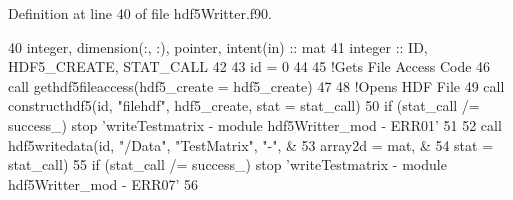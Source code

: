 Definition at line 40 of file hdf5\+Writter.\+f90.


\begin{DoxyCode}
40     \textcolor{keywordtype}{integer}, \textcolor{keywordtype}{dimension(:, :)}, \textcolor{keywordtype}{pointer}, \textcolor{keywordtype}{intent(in)} :: mat
41     \textcolor{keywordtype}{integer} :: ID, HDF5\_CREATE, STAT\_CALL
42     
43     id = 0
44     
45         \textcolor{comment}{!Gets File Access Code}
46         \textcolor{keyword}{call }gethdf5fileaccess(hdf5\_create = hdf5\_create)
47 
48         \textcolor{comment}{!Opens HDF File}
49         \textcolor{keyword}{call }constructhdf5(id, \textcolor{stringliteral}{"filehdf"}, hdf5\_create, stat = stat\_call)
50         \textcolor{keywordflow}{if} (stat\_call /= success\_) stop \textcolor{stringliteral}{'writeTestmatrix - module hdf5Writter\_mod - ERR01'}
51         
52         \textcolor{keyword}{call }hdf5writedata(id, \textcolor{stringliteral}{"/Data"}, \textcolor{stringliteral}{"TestMatrix"}, \textcolor{stringliteral}{"-"},         &
53                               array2d = mat,            &
54                               stat = stat\_call)
55         \textcolor{keywordflow}{if} (stat\_call /= success\_) stop \textcolor{stringliteral}{'writeTestmatrix - module hdf5Writter\_mod - ERR07'}
56         
\end{DoxyCode}
